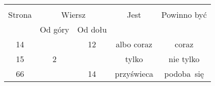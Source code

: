 \documentclass[a4paper,11pt]{article}
\begin{document}
\begin{center}

  \begin{tabular}{|c|c|c|c|c|}
    \hline
    & \multicolumn{2}{c|}{} & & \\
    Strona & \multicolumn{2}{c|}{Wiersz} & Jest
                              & Powinno być \\ \cline{2-3}
    & Od góry & Od dołu & & \\
    \hline
    14  & & 12 & albo coraz & coraz \\
    15  &  2 & & tylko & nie tylko \\
    66  & & 14 & przyświeca & podoba~się \\
    \hline
  \end{tabular}






\end{center}
\end{document}

